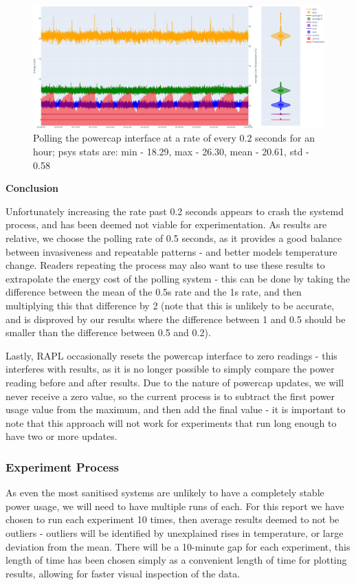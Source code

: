 \begin{figure}[H]
    \centering
    \includegraphics[width=15cm]{figures/implementation/control_systemd02}
    \caption{Polling the powercap interface at a rate of every 0.2 seconds for an hour; psys stats are: min - 18.29, max - 26.30, mean - 20.61, std - 0.58}
    \label{fig:systemd02ratetest}
\end{figure}


\textbf{Conclusion}

Unfortunately increasing the rate past 0.2 seconds appears to crash the systemd process, and has been deemed not viable
for experimentation.
As results are relative, we choose the polling rate of 0.5 seconds, as it provides a good balance between invasiveness
and repeatable patterns - and better models temperature change.
Readers repeating the process may also want to use these results to extrapolate the energy cost of the polling system -
this can be done by taking the difference between the mean of the 0.5s rate and the 1s rate, and then multiplying this
that difference by 2 (note that this is unlikely to be accurate, and is disproved by our results where the difference
between 1 and 0.5 should be smaller than the difference between 0.5 and 0.2).

Lastly, RAPL occasionally resets the powercap interface to zero readings - this interferes with results, as it is no
longer possible to simply compare the power reading before and after results.
Due to the nature of powercap updates, we will never receive a zero value, so the current process is to subtract the
first power usage value from the maximum, and then add the final value - it is important to note that this approach will
not work for experiments that run long enough to have two or more updates.

\subsubsection{Experiment Process}
As even the most sanitised systems are unlikely to have a completely stable power usage, we will need to have multiple
runs of each.
For this report we have chosen to run each experiment 10 times, then average results deemed to not be outliers -
outliers will be identified by unexplained rises in temperature, or large deviation from the mean.
There will be a 10-minute gap for each experiment, this length of time has been chosen simply as a convenient length of
time for plotting results, allowing for faster visual inspection of the data.